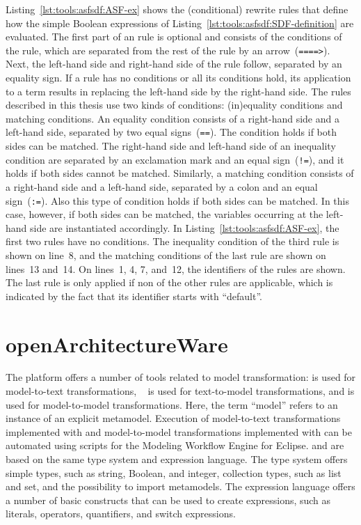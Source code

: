 Listing~\ref{lst:tools:asfsdf:ASF-ex} shows the (conditional) rewrite rules that define how the simple Boolean expressions of Listing~\ref{lst:tools:asfsdf:SDF-definition} are evaluated.
The first part of an \ASF rule is optional and consists of the conditions of the rule, which are separated from the rest of the rule by an arrow~(\texttt{====>}).
Next, the left-hand side and right-hand side of the rule follow, separated by an equality sign.
If a rule has no conditions or all its conditions hold, its application to a term results in replacing the left-hand side by the right-hand side.
The rules described in this thesis use two kinds of conditions: (in)equality conditions and matching conditions.
An equality condition consists of a right-hand side and a left-hand side, separated by two equal signs~(\texttt{==}).
The condition holds if both sides can be matched.
The right-hand side and left-hand side of an inequality condition are separated by an exclamation mark and an equal sign~(\texttt{!=}), and it holds if both sides cannot be matched.
Similarly, a matching condition consists of a right-hand side and a left-hand side, separated by a colon and an equal sign~(\texttt{:=}).
Also this type of condition holds if both sides can be matched.
In this case, however, if both sides can be matched, the variables occurring at the left-hand side are instantiated accordingly.
In Listing~\ref{lst:tools:asfsdf:ASF-ex}, the first two rules have no conditions.
The inequality condition of the third rule is shown on line~8, and the matching conditions of the last rule are shown on lines~13 and~14.
On lines~1, 4, 7, and~12, the identifiers of the rules are shown.
The last rule is only applied if non of the other rules are applicable, which is indicated by the fact that its identifier starts with ``default''.

\section{openArchitectureWare}
\label{sec:tools:xpandxtendxtext}

The \OAW platform offers a number of tools related to model transformation: \Xpand is used for model-to-text transformations, \Xtext~\cite{Efftinge2006xText} is used for text-to-model transformations, and \Xtend is used for model-to-model transformations.
Here, the term ``model'' refers to an instance of an explicit metamodel.
Execution of model-to-text transformations implemented with \Xpand and model-to-model transformations implemented with \Xtend can be automated using scripts for the Modeling Workflow Engine for Eclipse.
\Xpand and \Xtend are based on the same type system and expression language.
The type system offers simple types, such as string, Boolean, and integer, collection types, such as list and set, and the possibility to import metamodels.
The expression language offers a number of basic constructs that can be used to create expressions, such as literals, operators, quantifiers, and switch expressions.

